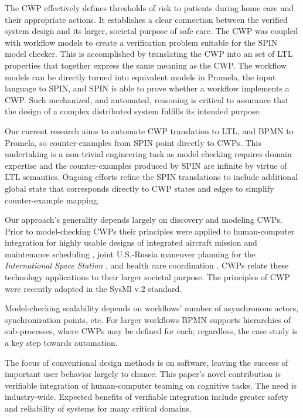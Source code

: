 The CWP effectively defines thresholds of risk to patients during home care and their appropriate actions. It establishes a clear connection between the verified system design and its larger, societal purpose of safe care.
The CWP was coupled with workflow models to create a verification problem suitable for the SPIN model checker. This is accomplished by translating the CWP into an set of LTL properties that together express the same meaning as the CWP. The workflow models can be directly turned into equivalent models in Promela, the input language to SPIN, and SPIN is able to prove whether a workflow implements a CWP. 
Such mechanized, and automated, reasoning is critical to assurance that the design of a complex distributed system fulfills its intended purpose. 

Our current research aims to automate CWP translation to LTL, and BPMN to Promela, so counter-examples from SPIN point directly to CWPs. This undertaking is a non-trivial engineering task as model checking requires domain expertise and the counter-examples produced by SPIN are infinite by virtue of LTL semantics. Ongoing efforts refine the SPIN translations to include additional global state that corresponds directly to CWP states and edges to simplify counter-example mapping.

Our approach's generality depends largely on discovery and modeling CWPs. Prior to model-checking CWPs their principles  were applied to human-computer integration for highly usable designs of integrated aircraft mission and maintenance scheduling \cite{workcentered}, joint U.S.-Russia maneuver planning for the \emph{International Space Station}  \cite{10.1145/1978942.1979311}, and health care coordination \cite{BERRY201615}. CWPs relate these technology applications to their larger societal purpose. The principles of CWP were recently adopted in the SysMl v.2 standard.

Model-checking scalability depends on workflows' number of asynchronous actors, synchronization points, etc. For larger workflows BPMN supports hierarchies of sub-processes, where CWPs may be defined for each; regardless, the case study is a key step towards automation. 

The focus of conventional design methods is on software, leaving the success of important user behavior largely to chance. This paper's novel contribution is verifiable integration of human-computer teaming on cognitive tasks. The need is industry-wide. Expected benefits of verifiable integration include greater safety and reliability of systems for many critical domains.
